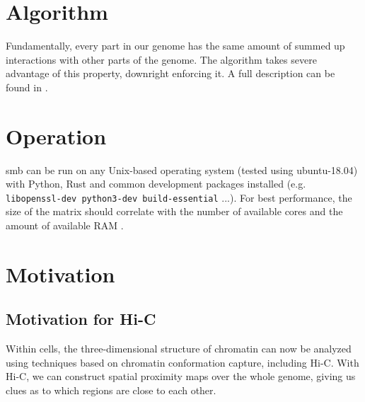


\section{Algorithm}\label{sec:algorithm}


Fundamentally, every part in our genome has the same amount of summed up
interactions with other parts of the genome. The algorithm takes severe
advantage of this property, downright enforcing it. A full description can be
found in .


\section{Operation}\label{sec:operation}

smb can be run on any Unix-based operating system (tested using ubuntu-18.04)
with Python, Rust and common development packages installed (e.g.
\verb!libopenssl-dev python3-dev build-essential! ...). For best performance, the
size of the matrix should correlate with the number of available cores and the
amount of available RAM .



\section{Motivation}\label{sec:motivation}

\subsection{Motivation for Hi-C}

Within cells, the three-dimensional structure of chromatin can now be analyzed
using techniques based on chromatin conformation capture, including Hi-C. With
Hi-C, we can construct spatial proximity maps over the whole genome, giving us
clues as to which regions are close to each other.


